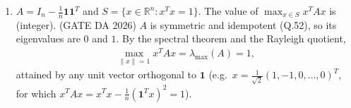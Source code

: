 \begin{enumerate}[label=\textbf{Q.\arabic*},leftmargin=*,start=1]
\item[\textbf{Q.65}] $A=I_n-\frac1n\mathbf{1}\mathbf{1}^T$ and
$S=\{x\in\mathbb R^n: x^Tx=1\}$. The value of $\max_{x\in S}x^TAx$ is
\underline{\hspace{1.5cm}} (integer).
\hfill (GATE DA 2026)
\solution
$A$ is symmetric and idempotent (Q.52), so its eigenvalues are $0$ and $1$. By the spectral
theorem and the Rayleigh quotient,
\begin{align}
\max_{\|x\|=1}x^TAx=\lambda_{\max}(A)=1 ,
\end{align}
attained by any unit vector orthogonal to $\mathbf 1$ (e.g.\ $x=\tfrac1{\sqrt2}(1,-1,0,\dots,0)^T$, for which
$x^TAx=x^Tx-\tfrac1n(\mathbf 1^Tx)^2=1$).

\end{enumerate}


